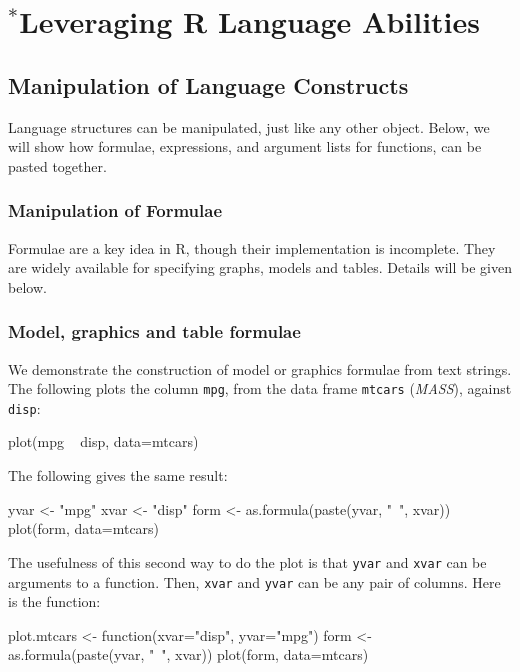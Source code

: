 \documentclass{tufte-book}\usepackage[]{graphicx}\usepackage[]{color}
\newcommand{\txtt}[1]{\texttt{#1}}
\begin{document}
% 
\cleartooddpage

\chapter{$^*$Leveraging R Language Abilities }





\section{Manipulation of Language Constructs}

Language structures can be manipulated, just like any other object.
Below, we will show how formulae, expressions, and argument lists
for functions, can be pasted together.

\subsection{Manipulation of Formulae}

Formulae are a key idea in R, though their implementation is
incomplete. They are widely available for specifying graphs,
models and tables. Details will be given below.

\subsection*{Model, graphics and table formulae}
We demonstrate the construction of model or graphics formulae from
text strings. The following plots the column \txtt{mpg}, from the data
frame \txtt{mtcars} (\textit{MASS}), against \txtt{disp}:
\begin{Schunk}
\begin{Sinput}
plot(mpg ~ disp, data=mtcars)
\end{Sinput}
\end{Schunk}
The following gives the same result:
\begin{Schunk}
\begin{Sinput}
yvar <- "mpg"
xvar <- "disp"
form <- as.formula(paste(yvar, "~", xvar))
plot(form, data=mtcars)
\end{Sinput}
\end{Schunk}
The usefulness of this second way to do the plot is that \txtt{yvar}
and \txtt{xvar} can be arguments to a function.  Then, \txtt{xvar} and
\txtt{yvar} can be any pair of columns.  Here is the function:
\begin{Schunk}
\begin{Sinput}
plot.mtcars <- function(xvar="disp", yvar="mpg"){
    form <- as.formula(paste(yvar, "~", xvar))
    plot(form, data=mtcars)
}
\end{Sinput}
\end{Schunk}
\end{document}
